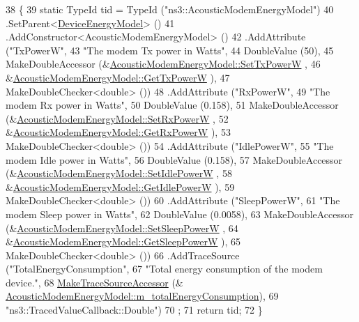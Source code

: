 \begin{DoxyCode}
38 \{
39   \textcolor{keyword}{static} TypeId tid = TypeId (\textcolor{stringliteral}{"ns3::AcousticModemEnergyModel"})
40     .SetParent<\hyperlink{classns3_1_1DeviceEnergyModel_a29174f25707f14465081d80b555e3589}{DeviceEnergyModel}> ()
41     .AddConstructor<AcousticModemEnergyModel> ()
42     .AddAttribute (\textcolor{stringliteral}{"TxPowerW"},
43                    \textcolor{stringliteral}{"The modem Tx power in Watts"},
44                    DoubleValue (50),
45                    MakeDoubleAccessor (&\hyperlink{classns3_1_1AcousticModemEnergyModel_adf451e8028d29a8a98012ab11da45359}{AcousticModemEnergyModel::SetTxPowerW}
      ,
46                                        &\hyperlink{classns3_1_1AcousticModemEnergyModel_a47f9c6f65e5ffd7133e6fc70cf173bd8}{AcousticModemEnergyModel::GetTxPowerW}
      ),
47                    MakeDoubleChecker<double> ())
48     .AddAttribute (\textcolor{stringliteral}{"RxPowerW"},
49                    \textcolor{stringliteral}{"The modem Rx power in Watts"},
50                    DoubleValue (0.158),
51                    MakeDoubleAccessor (&\hyperlink{classns3_1_1AcousticModemEnergyModel_a2c0eae8ca46f703c3559c8b54617b34f}{AcousticModemEnergyModel::SetRxPowerW}
      ,
52                                        &\hyperlink{classns3_1_1AcousticModemEnergyModel_a41af38f83b970d959b120525507c020b}{AcousticModemEnergyModel::GetRxPowerW}
      ),
53                    MakeDoubleChecker<double> ())
54     .AddAttribute (\textcolor{stringliteral}{"IdlePowerW"},
55                    \textcolor{stringliteral}{"The modem Idle power in Watts"},
56                    DoubleValue (0.158),
57                    MakeDoubleAccessor (&\hyperlink{classns3_1_1AcousticModemEnergyModel_aa7d720f7e9784c31a8bb016b7d2f3677}{AcousticModemEnergyModel::SetIdlePowerW}
      ,
58                                        &\hyperlink{classns3_1_1AcousticModemEnergyModel_a60265ec94e8c5422f7042f10bad02b2b}{AcousticModemEnergyModel::GetIdlePowerW}
      ),
59                    MakeDoubleChecker<double> ())
60     .AddAttribute (\textcolor{stringliteral}{"SleepPowerW"},
61                    \textcolor{stringliteral}{"The modem Sleep power in Watts"},
62                    DoubleValue (0.0058),
63                    MakeDoubleAccessor (&\hyperlink{classns3_1_1AcousticModemEnergyModel_abf8c0c009a2b90b9e2f9ad77da26e015}{AcousticModemEnergyModel::SetSleepPowerW}
      ,
64                                        &\hyperlink{classns3_1_1AcousticModemEnergyModel_a21675842bdfc083a353146d39593aba8}{AcousticModemEnergyModel::GetSleepPowerW}
      ),
65                    MakeDoubleChecker<double> ())
66     .AddTraceSource (\textcolor{stringliteral}{"TotalEnergyConsumption"},
67                      \textcolor{stringliteral}{"Total energy consumption of the modem device."},
68                      \hyperlink{group__tracing_gab21a770b9855af4e8f69f7531ea4a6b0}{MakeTraceSourceAccessor} (&
      \hyperlink{classns3_1_1AcousticModemEnergyModel_a435aaa2f2bfec309d87b476c4f17b647}{AcousticModemEnergyModel::m\_totalEnergyConsumption}),
69                      \textcolor{stringliteral}{"ns3::TracedValueCallback::Double"})
70   ;
71   \textcolor{keywordflow}{return} tid;
72 \}
\end{DoxyCode}


